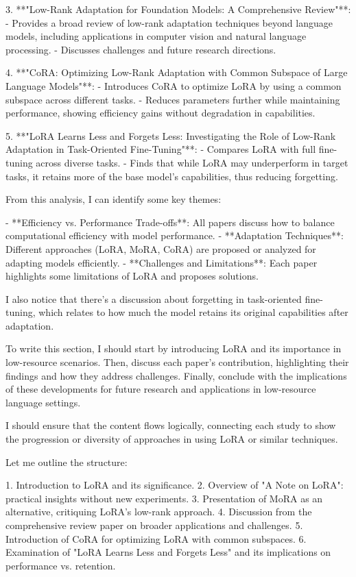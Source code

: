 \documentclass[conference]{IEEEtran}
\begin{document}
3. **"Low-Rank Adaptation for Foundation Models: A Comprehensive Review"**:
   - Provides a broad review of low-rank adaptation techniques beyond language models, including applications in computer vision and natural language processing.
   - Discusses challenges and future research directions.

4. **"CoRA: Optimizing Low-Rank Adaptation with Common Subspace of Large Language Models"**:
   - Introduces CoRA to optimize LoRA by using a common subspace across different tasks.
   - Reduces parameters further while maintaining performance, showing efficiency gains without degradation in capabilities.

5. **"LoRA Learns Less and Forgets Less: Investigating the Role of Low-Rank Adaptation in Task-Oriented Fine-Tuning"**:
   - Compares LoRA with full fine-tuning across diverse tasks.
   - Finds that while LoRA may underperform in target tasks, it retains more of the base model's capabilities, thus reducing forgetting.

From this analysis, I can identify some key themes:

- **Efficiency vs. Performance Trade-offs**: All papers discuss how to balance computational efficiency with model performance.
- **Adaptation Techniques**: Different approaches (LoRA, MoRA, CoRA) are proposed or analyzed for adapting models efficiently.
- **Challenges and Limitations**: Each paper highlights some limitations of LoRA and proposes solutions.

I also notice that there's a discussion about forgetting in task-oriented fine-tuning, which relates to how much the model retains its original capabilities after adaptation.

To write this section, I should start by introducing LoRA and its importance in low-resource scenarios. Then, discuss each paper's contribution, highlighting their findings and how they address challenges. Finally, conclude with the implications of these developments for future research and applications in low-resource language settings.

I should ensure that the content flows logically, connecting each study to show the progression or diversity of approaches in using LoRA or similar techniques.

Let me outline the structure:

1. Introduction to LoRA and its significance.
2. Overview of "A Note on LoRA": practical insights without new experiments.
3. Presentation of MoRA as an alternative, critiquing LoRA's low-rank approach.
4. Discussion from the comprehensive review paper on broader applications and challenges.
5. Introduction of CoRA for optimizing LoRA with common subspaces.
6. Examination of "LoRA Learns Less and Forgets Less" and its implications on performance vs. retention.
\end{document}
